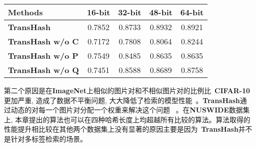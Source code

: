 \begin{table}[!htpb]
\begin{tabular}{cccccc}
    \multicolumn{2}{l|}{Methods} & 16-bit & 32-bit & 48-bit & 64-bit   \\\hline
    \hline
    \multicolumn{2}{l|}{\textbf{TransHash}} & 0.7852 & 0.8733 & 0.8932 & 0.8921  \\
    \multicolumn{2}{l|}{\textbf{TransHash w/o C}} & 0.7172 & 0.7808 & 0.8064 & 0.8244  \\
    \multicolumn{2}{l|}{\textbf{TransHash w/o P}} & 0.7549 & 0.8485 & 0.8635 & 0.8635  \\
    \multicolumn{2}{l|}{\textbf{TransHash w/o Q}} & 0.7451 & 0.8588 & 0.8689 & 0.8758  \\
    \hline
    \hline 
    \end{tabular}
    \label{table:ablation}
  \end{table}





第二个原因是在\textbf{ImageNet}上相似的图片对和不相似图片对的比例比~\textbf{CIFAR-10}更加严重, 造成了数据不平衡问题, 大大降低了检索的模型性能~\cite{zhang2019improved,liu2016deep}。\textbf{TransHash}通过动态的对每一个图片对分配一个权重来解决这个问题~ \cite{cao2017hashnet}。在\textbf{NUSWIDE}数据集上, 本章提出的算法也可以在四种哈希长度上均超越所有比较的算法。算法取得的性能提升相比较在其他两个数据集上没有显著的原因主要是因为~\textbf{TransHash}并不是针对多标签检索的场景。\par


